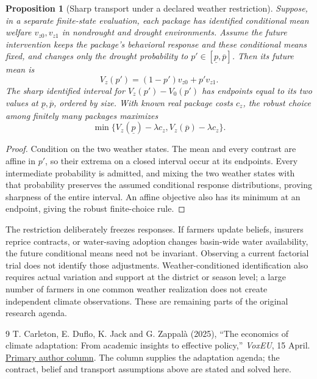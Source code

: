 \documentclass[11pt,a4paper]{article}
\newtheorem{proposition}[theorem]{Proposition}
\theoremstyle{remark}
\begin{document}
\begin{proposition}[Sharp transport under a declared weather restriction]
Suppose, in a separate finite-state evaluation, each package has identified conditional mean welfare $v_{z0},v_{z1}$ in nondrought and drought environments. Assume the future intervention keeps the package's behavioral response and these conditional means fixed, and changes only the drought probability to $p'\in[\underline p,\overline p]$. Then its future mean is
\[
 V_z(p')=(1-p')v_{z0}+p'v_{z1}.
\]
The sharp identified interval for $V_z(p')-V_0(p')$ has endpoints equal to its two values at $\underline p,\overline p$, ordered by size. With known real package costs $c_z$, the robust choice among finitely many packages maximizes
\[
 \min\{V_z(\underline p)-\lambda c_z,
          V_z(\overline p)-\lambda c_z\}.
\]
\end{proposition}
\begin{proof}
Condition on the two weather states. The mean and every contrast are affine in $p'$, so their extrema on a closed interval occur at its endpoints. Every intermediate probability is admitted, and mixing the two weather states with that probability preserves the assumed conditional response distributions, proving sharpness of the entire interval. An affine objective also has its minimum at an endpoint, giving the robust finite-choice rule.
\end{proof}
The restriction deliberately freezes responses. If farmers update beliefs, insurers reprice contracts, or water-saving adoption changes basin-wide water availability, the future conditional means need not be invariant. Observing a current factorial trial does not identify those adjustments. Weather-conditioned identification also requires actual variation and support at the district or season level; a large number of farmers in one common weather realization does not create independent climate observations. These are remaining parts of the original research agenda.

\begin{thebibliography}{9}
 T. Carleton, E. Duflo, K. Jack and G. Zappal\`a (2025), ``The economics of climate adaptation: From academic insights to effective policy,'' \emph{VoxEU}, 15 April. \href{https://cepr.org/voxeu/columns/economics-climate-adaptation-academic-insights-effective-policy}{Primary author column}. The column supplies the adaptation agenda; the contract, belief and transport assumptions above are stated and solved here.
\end{thebibliography}
\end{document}
